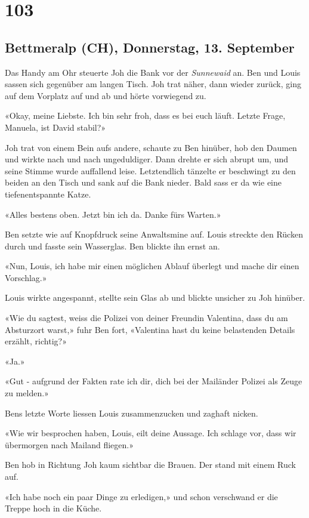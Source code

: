 \chapter{103}

\section{Bettmeralp (CH), Donnerstag, 13.
September}

Das Handy am Ohr steuerte Joh die Bank vor der \emph{Sunnewaid} an. Ben
und Louis sassen sich gegenüber am langen Tisch. Joh trat näher, dann
wieder zurück, ging auf dem Vorplatz auf und ab und hörte vorwiegend zu.

«Okay, meine Liebste. Ich bin sehr froh, dass es bei euch läuft. Letzte
Frage, Manuela, ist David stabil?»

Joh trat von einem Bein aufs andere, schaute zu Ben hinüber, hob den Daumen und wirkte
nach und nach ungeduldiger. Dann drehte er sich abrupt um, und seine
Stimme wurde auffallend leise. Letztendlich tänzelte er beschwingt zu
den beiden an den Tisch und sank auf die Bank nieder. Bald sass er da
wie eine tiefenentspannte Katze.

«Alles bestens oben. Jetzt bin ich da. Danke fürs Warten.»

Ben setzte wie auf Knopfdruck seine Anwaltsmine auf. Louis
streckte den Rücken durch und fasste sein Wasserglas. Ben blickte ihn
ernst an.

«Nun, Louis, ich habe mir einen möglichen Ablauf überlegt und mache dir
einen Vorschlag.»

Louis wirkte angespannt, stellte sein Glas ab und blickte unsicher zu
Joh hinüber.

«Wie du sagtest, weiss die Polizei von deiner Freundin Valentina, dass du am
Absturzort warst,» fuhr Ben fort, «Valentina hast du keine belastenden
Details erzählt, richtig?»

«Ja.»

«Gut - aufgrund der Fakten rate ich dir, dich bei der Mailänder Polizei als
Zeuge zu melden.»

Bens letzte Worte liessen Louis zusammenzucken und zaghaft nicken.

«Wie wir besprochen haben, Louis, eilt deine Aussage. Ich schlage vor, dass wir übermorgen nach Mailand fliegen.»

Ben hob in Richtung Joh kaum sichtbar die Brauen. Der stand mit einem Ruck auf.

«Ich habe noch ein paar Dinge zu erledigen,» und schon verschwand er die Treppe hoch in die Küche.

